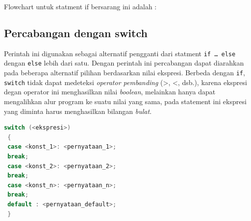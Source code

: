 Flowchart untuk statment if bersarang ini adalah :


\subsection{Percabangan dengan switch}\label{percabangan-dengan-switch}

Perintah ini digunakan sebagai alternatif pengganti dari statment
\texttt{if\ \ldots{}\ else} dengan \texttt{else} lebih dari satu. Dengan
perintah ini percabangan dapat diarahkan pada beberapa alternatif
pilihan berdasarkan nilai ekspresi. Berbeda dengan \texttt{if},
\texttt{switch} tidak dapat medeteksi \emph{operator pembanding}
(\textgreater{}, \textless{}, dsb.), karena ekspresi degan operator ini
menghasilkan nilai \emph{boolean}, melainkan hanya dapat mengalihkan
alur program ke suatu nilai yang sama, pada statement ini ekspresi yang
diminta harus menghasilkan bilangan \emph{bulat}.

\begin{lstlisting}[language=c++, numbers=none]
 switch (<ekspresi>)
 {
 case <konst_1>: <pernyataan_1>;
 break;
 case <konst_2>: <pernyataan_2>;
 break;
 case <konst_n>: <pernyataan_n>;
 break;
 default : <pernyataan_default>;
 }
\end{lstlisting}

